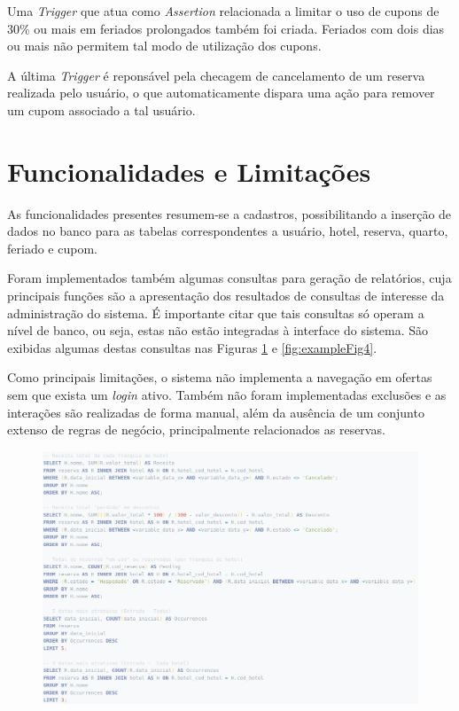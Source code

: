 \documentclass[a4paper, 12pt]{article}
\begin{document}
Uma \emph{Trigger} que atua como \emph{Assertion} relacionada a limitar o uso de cupons de 30\% ou mais em feriados prolongados também foi criada. Feriados com dois dias ou mais não permitem tal modo de utilização dos cupons.

A última \emph{Trigger} é reponsável pela checagem de cancelamento de um reserva realizada pelo usuário, o que automaticamente dispara uma ação para remover um cupom associado a tal usuário.

\section{Funcionalidades e Limitações}

As funcionalidades presentes resumem-se a cadastros, possibilitando a inserção de dados no banco para as tabelas correspondentes a usuário, hotel, reserva, quarto, feriado e cupom.

Foram implementados também algumas consultas para geração de relatórios, cuja principais funções são a apresentação dos resultados de consultas de interesse da administração do sistema. É importante citar que tais consultas só operam a nível de banco, ou seja, estas não estão integradas à interface do sistema. São exibidas algumas destas consultas nas Figuras \ref{fig:exampleFig3} e \ref{fig:exampleFig4}.

Como principais limitações, o sistema não implementa a navegação em ofertas sem que exista um \emph{login} ativo. Também não foram implementadas exclusões e as interações são realizadas de forma manual, além da ausência de um conjunto extenso de regras de negócio, principalmente relacionados as reservas.

\begin{figure}[H]
    \centering
    \includegraphics[width=1.2\textwidth]{Images/1.png}
    \label{fig:exampleFig3}
\end{figure}
\end{document}
